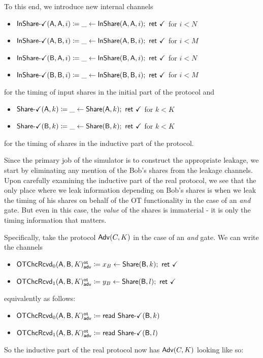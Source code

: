 \noindent To this end, we introduce new internal channels
\begin{itemize}
\item {\color{teal} $\mathsf{InShare}\textsf{-}\checkmark(\mathsf{A},\mathsf{A},i) \coloneqq \_ \leftarrow \mathsf{InShare}(\mathsf{A},\mathsf{A},i); \ \mathsf{ret} \ \checkmark$ for $i < N$}
\item {\color{teal} $\mathsf{InShare}\textsf{-}\checkmark(\mathsf{A},\mathsf{B},i) \coloneqq \_ \leftarrow \mathsf{InShare}(\mathsf{A},\mathsf{B},i); \ \mathsf{ret} \ \checkmark$ for $i < M$}
\item {\color{teal} $\mathsf{InShare}\textsf{-}\checkmark(\mathsf{B},\mathsf{A},i) \coloneqq \_ \leftarrow \mathsf{InShare}(\mathsf{B},\mathsf{A},i); \ \mathsf{ret} \ \checkmark$ for $i < N$}
\item {\color{teal} $\mathsf{InShare}\textsf{-}\checkmark(\mathsf{B},\mathsf{B},i) \coloneqq \_ \leftarrow \mathsf{InShare}(\mathsf{B},\mathsf{B},i); \ \mathsf{ret} \ \checkmark$ for $i < M$}
\end{itemize}
for the timing of input shares in the initial part of the protocol and
\begin{itemize}
\item {\color{teal} $\mathsf{Share}\textsf{-}\checkmark(\mathsf{A},k) \coloneqq \_ \leftarrow \mathsf{Share}(\mathsf{A},k); \ \mathsf{ret} \ \checkmark$ for $k < K$}
\item {\color{teal} $\mathsf{Share}\textsf{-}\checkmark(\mathsf{B},k) \coloneqq \_ \leftarrow \mathsf{Share}(\mathsf{B},k); \ \mathsf{ret} \ \checkmark$ for $k < K$}
\end{itemize}
for the timing of shares in the inductive part of the protocol.\medskip

Since the primary job of the simulator is to construct the appropriate leakage, we start by eliminating any mention of the Bob's shares from the leakage channels. Upon carefully examining the inductive part of the real protocol, we see that the only place where we leak information depending on Bob's shares is when we leak the timing of his shares on behalf of the OT functionality in the case of an \emph{and} gate. But even in this case, the \emph{value} of the shares is immaterial - it is only the timing information that matters.\medskip

\noindent Specifically, take the protocol $\mathsf{Adv}(C,K)$ in the case of an \emph{and} gate. We can write the channels
\begin{itemize}
\item {\color{blue} $\mathsf{OTChcRcvd}_0(\mathsf{A},\mathsf{B},K)^{\mathsf{ot}}_{\mathsf{adv}} \coloneqq x_B \leftarrow \mathsf{Share}(\mathsf{B},k); \ \mathsf{ret} \ \checkmark$}
\item {\color{blue} $\mathsf{OTChcRcvd}_1(\mathsf{A},\mathsf{B},K)^{\mathsf{ot}}_{\mathsf{adv}} \coloneqq y_B \leftarrow \mathsf{Share}(\mathsf{B},l); \ \mathsf{ret} \ \checkmark$}
\end{itemize}
equivalently as follows:
\begin{itemize}
\item {\color{blue} $\mathsf{OTChcRcvd}_0(\mathsf{A},\mathsf{B},K)^{\mathsf{ot}}_{\mathsf{adv}} \coloneqq \mathsf{read} \ \mathsf{Share}\textsf{-}\checkmark(\mathsf{B},k)$}
\item {\color{blue} $\mathsf{OTChcRcvd}_1(\mathsf{A},\mathsf{B},K)^{\mathsf{ot}}_{\mathsf{adv}} \coloneqq \mathsf{read} \ \mathsf{Share}\textsf{-}\checkmark(\mathsf{B},l)$}
\end{itemize}
So the inductive part of the real protocol now has $\mathsf{Adv}(C,K)$ looking like so:

